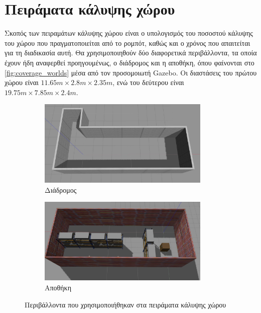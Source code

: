 \section{Πειράματα κάλυψης χώρου}
\label{section:coverage_tests}

Σκοπός των πειραμάτων κάλυψης χώρου είναι ο υπολογισμός του ποσοστού κάλυψης του χώρου που πραγματοποιείται από το ρομπότ, καθώς και ο χρόνος που απαιτείται για τη διαδικασία αυτή. Θα χρησιμοποιηθούν δύο διαφορετικά περιβάλλοντα, τα οποία έχουν ήδη αναφερθεί προηγουμένως, ο διάδρομος και η αποθήκη, όπου φαίνονται στο \autoref{fig:coverage_worlds} μέσα από τον προσομοιωτή Gazebo. Οι διαστάσεις του πρώτου χώρου είναι $11.65\si{m} \times 2.8\si{m} \times 2.35\si{m}$, ενώ του δεύτερου είναι $19.75\si{m} \times 7.85\si{m} \times 2.4\si{m}$.

\begin{figure}[!ht]
        \begin{subfigure}{0.5\textwidth}
            \includegraphics[width=0.9\textwidth]{./images/chapter5/corridor.jpg}
                \caption{Διάδρομος}
             \label{fig:corridor}
        \end{subfigure}
        \begin{subfigure}{0.5\textwidth}
            \includegraphics[width=0.9\textwidth]{./images/chapter5/warehouse.jpg}
            \caption{Αποθήκη}
            \label{fig:warehouse}
        \end{subfigure}
        \caption{Περιβάλλοντα που χρησιμοποιήθηκαν στα πειράματα κάλυψης χώρου}
        \label{fig:coverage_worlds}
\end{figure} 

